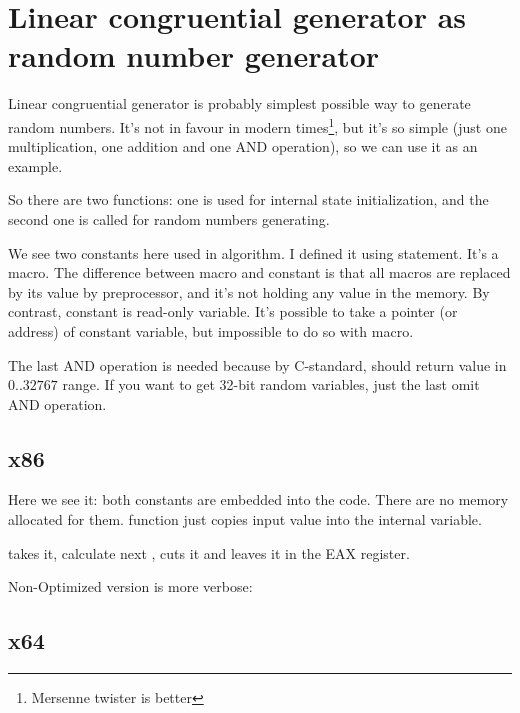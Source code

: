 \ifx\RUSSIAN\undefined
\chapter{Linear congruential generator as random number generator}
\label{LCG_simple}

Linear congruential generator is probably simplest possible way to generate random numbers.
It's not in favour in modern times\footnote{Mersenne twister is better}, but it's so simple 
(just one multiplication, one addition and one AND operation), 
so we can use it as an example.



So there are two functions: one is used for internal state initialization, and the second one is called
for random numbers generating.

We see two constants here used in algorithm.
I defined it using  \CCpp statement. It's a macro.
The difference between \CCpp macro and constant is that all macros are replaced by its value by \CCpp preprocessor,
and it's not holding any value in the memory.
By contrast, constant is read-only variable.
It's possible to take a pointer (or address) of constant variable, but impossible to do so with macro.

The last AND operation is needed because by C-standard,  should return value in $0..32767$ range.
If you want to get 32-bit random variables, just the last omit AND operation.

\section{x86}



Here we see it: both constants are embedded into the code. There are no memory allocated for them.
 function just copies input value into the internal  variable.

 takes it, calculate next , cuts it and leaves it in the EAX register.

Non-Optimized version is more verbose:



\section{x64}


